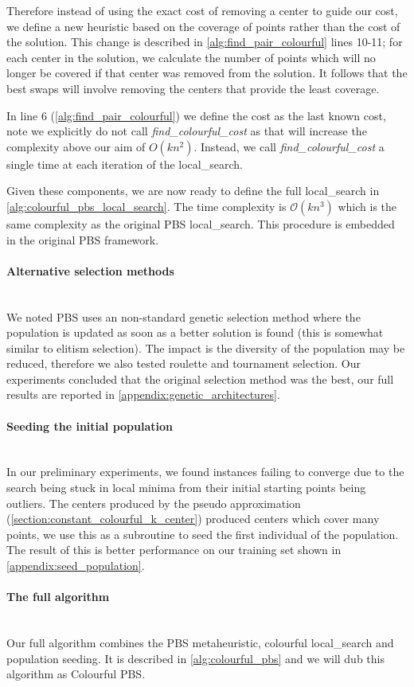 

Therefore instead of using the exact cost of removing a center to guide our cost, we define a new heuristic based on the coverage of points rather than the cost of the solution. This change is described in \cref{alg:find_pair_colourful} lines 10-11; for each center in the solution, we calculate the number of points which will no longer be covered if that center was removed from the solution. It follows that the best swaps will involve removing the centers that provide the least coverage.

In line 6 (\cref{alg:find_pair_colourful}) we define the cost as the last known cost, note we explicitly do not call \emph{find\_colourful\_cost} as that will increase the complexity above our aim of ${O}(kn^2)$. Instead, we call \emph{find\_colourful\_cost} a single time at each iteration of the \gls{local_search}.

Given these components, we are now ready to define the full \gls{local_search} in \cref{alg:colourful_pbs_local_search}. The time complexity is $\mathcal{O}(kn^3)$ which is the same complexity as the original PBS \gls{local_search}. This procedure is embedded in the original PBS framework.



\paragraph{Alternative selection methods}~\\
We noted PBS uses an non-standard genetic selection method where the population is updated as soon as a better solution is found (this is somewhat similar to elitism selection). The impact is the diversity of the population may be reduced, therefore we also tested roulette and tournament selection. Our experiments concluded that the original selection method was the best, our full results are reported in \cref{appendix:genetic_architectures}.

\paragraph{Seeding the initial population}~\\
In our preliminary experiments, we found instances failing to converge due to the search being stuck in local minima from their initial starting points being outliers. The centers produced by the pseudo approximation (\cref{section:constant_colourful_k_center}) produced centers which cover many points, we use this as a subroutine to seed the first individual of the population. The result of this is better performance on our training set shown in \cref{appendix:seed_population}.

\paragraph{The full algorithm}~\\
Our full algorithm combines the PBS metaheuristic, colourful \gls{local_search} and population seeding. It is described in \cref{alg:colourful_pbs} and we will dub this algorithm as Colourful PBS.

